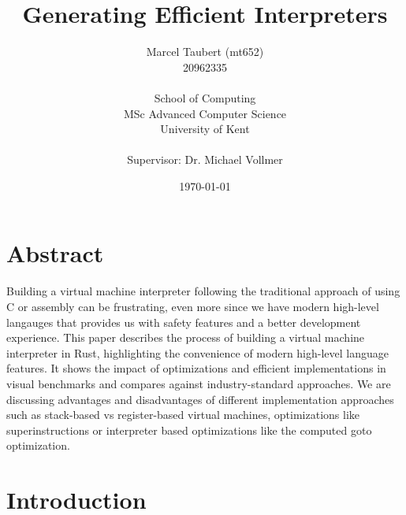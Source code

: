 \documentclass{article}
\title{Generating Efficient Interpreters}
\author{
    Marcel Taubert  (mt652)\\
    20962335        \\
    \\
    School of Computing \\
    MSc Advanced Computer Science\\
    University of Kent \\
    \\
    Supervisor: Dr. Michael Vollmer
}
\date{\today}
\begin{document}
\maketitle
\clearpage
\tableofcontents

\section{Abstract}
Building a virtual machine interpreter following the traditional approach of
using C or assembly can be frustrating, even more since we have modern
high-level langauges that provides us with safety features and a better
development experience. This paper describes the process of building a virtual
machine interpreter in Rust, highlighting the convenience of modern high-level
language features. It shows the impact of optimizations and efficient
implementations in visual benchmarks and compares against industry-standard
approaches. We are discussing advantages and disadvantages of different
implementation approaches such as stack-based vs register-based virtual
machines, optimizations like superinstructions or interpreter based
optimizations like the computed goto optimization.

\section{Introduction}

\end{document}
